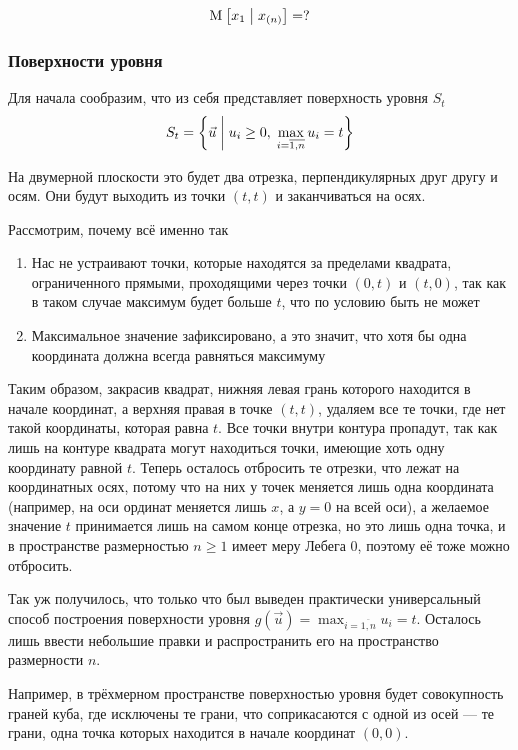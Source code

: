 $$\operatorname{M}_{} \left[ x_1 \;\middle|\; x_{\left( n \right)} \right] = ?$$

\subsubsection{Поверхности уровня}
Для начала сообразим, что из себя представляет поверхность уровня
$S_t$
$$S_t = \left\{ \vec{u} \;\middle|\;
  u_i \ge 0,\; \max_{i= \overline{1,n}} u_i = t \right\}$$

На двумерной плоскости это будет два отрезка,
перпендикулярных друг другу и осям.
Они будут выходить из точки $\left( t, t \right)$
и заканчиваться на осях.

Рассмотрим, почему всё именно так
\begin{enumerate}
  \item Нас не устраивают точки, которые находятся за пределами
      квадрата, ограниченного прямыми, проходящими через точки
      $\left( 0, t \right)$ и $\left( t, 0 \right)$,
      так как в таком случае максимум будет больше $t$,
      что по условию быть не может
  \item Максимальное значение зафиксировано, а это значит,
      что хотя бы одна координата должна
      всегда равняться максимуму
\end{enumerate}

Таким образом, закрасив квадрат, нижняя левая грань которого
находится в начале координат, а верхняя правая в точке $\left( t, t \right)$,
удаляем все те точки, где нет такой координаты, которая равна $t$.
Все точки внутри контура пропадут, так как лишь на контуре квадрата
могут находиться точки, имеющие хоть одну координату равной $t$.
Теперь осталось отбросить те отрезки, что лежат на координатных осях,
потому что на них у точек меняется лишь одна координата
(например, на оси ординат меняется лишь $x$, а $y=0$ на всей оси),
а желаемое значение $t$ принимается лишь на самом конце отрезка,
но это лишь одна точка, и в пространстве размерностью $n \ge 1$
имеет меру Лебега $0$, поэтому её тоже можно отбросить.

Так уж получилось, что только что был выведен
практически универсальный способ построения поверхности уровня
$g\left( \vec{u} \right) = \max_{i= \overline{1,n}} u_i = t$.
Осталось лишь ввести небольшие правки и распространить его на
пространство размерности $n$.

Например, в трёхмерном пространстве поверхностью уровня будет
совокупность граней куба, где исключены те грани,
что соприкасаются с одной из осей --- те грани, одна точка которых
находится в начале координат $\left( 0, 0 \right)$.

